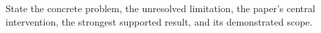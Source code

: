 State the concrete problem, the unresolved limitation, the paper's central
intervention, the strongest supported result, and its demonstrated scope.
